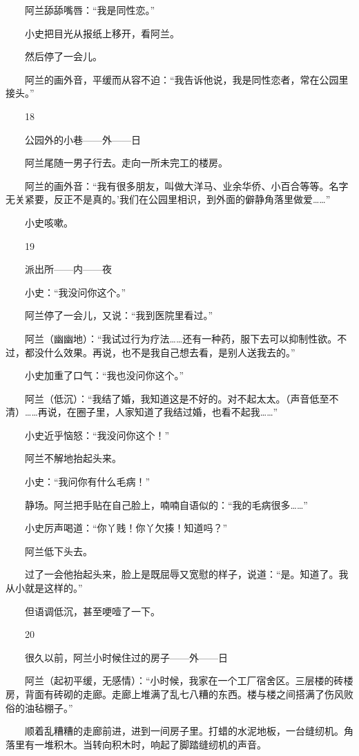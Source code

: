 　　阿兰舔舔嘴唇：“我是同性恋。” 

　　小史把目光从报纸上移开，看阿兰。 

　　然后停了一会儿。 

　　阿兰的画外音，平缓而从容不迫：“我告诉他说，我是同性恋者，常在公园里接头。” 

　　18 

　　公园外的小巷——外——日 

　　阿兰尾随一男子行去。走向一所未完工的楼房。 

　　阿兰的画外音：“我有很多朋友，叫做大洋马、业余华侨、小百合等等。名字无关紧要，反正不是真的。'我们在公园里相识，到外面的僻静角落里做爱……” 

　　小史咳嗽。 

　　19 

　　派出所——内——夜 

　　小史：“我没问你这个。” 

　　阿兰停了一会儿，又说：“我到医院里看过。” 

　　阿兰（幽幽地）：“我试过行为疗法……还有一种药，服下去可以抑制性欲。不过，都没什么效果。再说，也不是我自己想去看，是别人送我去的。” 

　　小史加重了口气：“我也没问你这个。” 

　　阿兰（低沉）：“我结了婚，我知道这是不好的。对不起太太。（声音低至不清）……再说，在圈子里，人家知道了我结过婚，也看不起我……” 

　　小史近乎恼怒：“我没问你这个！” 

　　阿兰不解地抬起头来。 

　　小史：“我问你有什么毛病！” 

　　静场。阿兰把手贴在自己脸上，喃喃自语似的：“我的毛病很多……” 

　　小史厉声喝道：“你丫贱！你丫欠揍！知道吗？” 

　　阿兰低下头去。 

　　过了一会他抬起头来，脸上是既屈辱又宽慰的样子，说道：“是。知道了。我从小就是这样的。” 

　　但语调低沉，甚至哽噎了一下。 

　　20 

　　很久以前，阿兰小时候住过的房子——外——日 

　　阿兰（起初平缓，无感情）：“小时候，我家在一个工厂宿舍区。三层楼的砖楼房，背面有砖砌的走廊。走廊上堆满了乱七八糟的东西。楼与楼之间搭满了伤风败俗的油毡棚子。” 

　　顺着乱糟糟的走廊前进，进到一间房子里。打蜡的水泥地板，一台缝纫机。角落里有一堆积木。当转向积木时，响起了脚踏缝纫机的声音。 

